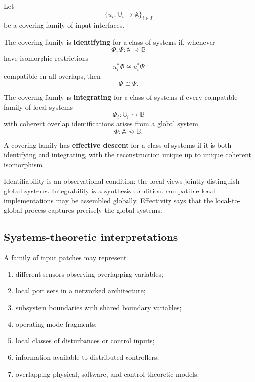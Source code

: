 Let
\[
    \{u_i:\mathbb U_i\to\mathbb A\}_{i\in I}
\]
be a covering family of input interfaces.

\begin{definition}
\label{def:interface-identifiability}
The covering family is \textbf{identifying} for a class of systems if, whenever
\[
    \Phi,\Psi:\mathbb A\rightsquigarrow\mathbb B
\]
have isomorphic restrictions
\[
    u_i^\ast\Phi\cong u_i^\ast\Psi
\]
compatible on all overlaps, then
\[
    \Phi\cong\Psi.
\]
\end{definition}

\begin{definition}
\label{def:interface-integrability}
The covering family is \textbf{integrating} for a class of systems if every
compatible family of local systems
\[
    \Phi_i:\mathbb U_i\rightsquigarrow\mathbb B
\]
with coherent overlap identifications arises from a global system
\[
    \Phi:\mathbb A\rightsquigarrow\mathbb B.
\]
\end{definition}

\begin{definition}
\label{def:effective-interface-descent-informal}
A covering family has \textbf{effective descent} for a class of systems if it
is both identifying and integrating, with the reconstruction unique up to
unique coherent isomorphism.
\end{definition}

Identifiability is an observational condition: the local views jointly
distinguish global systems. Integrability is a synthesis condition:
compatible local implementations may be assembled globally. Effectivity says
that the local-to-global process captures precisely the global systems.

\subsection{Systems-theoretic interpretations}
\label{subsec:systems-interpretations-descent}

A family of input patches may represent:
\begin{enumerate}
    \item different sensors observing overlapping variables;
    \item local port sets in a networked architecture;
    \item subsystem boundaries with shared boundary variables;
    \item operating-mode fragments;
    \item local classes of disturbances or control inputs;
    \item information available to distributed controllers;
    \item overlapping physical, software, and control-theoretic models.
\end{enumerate}

